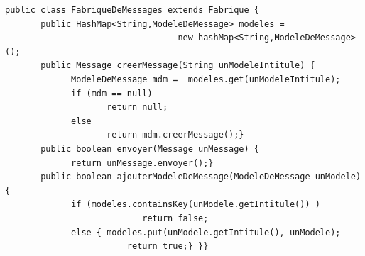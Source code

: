 \documentclass[12pt,French]{article}
\begin{document}
\begin{lstlisting}
public class FabriqueDeMessages extends Fabrique {
       public HashMap<String,ModeleDeMessage> modeles =
                                  new hashMap<String,ModeleDeMessage>();
       public Message creerMessage(String unModeleIntitule) {
             ModeleDeMessage mdm =  modeles.get(unModeleIntitule);
             if (mdm == null)
                    return null;
             else
                    return mdm.creerMessage();}
       public boolean envoyer(Message unMessage) {
             return unMessage.envoyer();}
       public boolean ajouterModeleDeMessage(ModeleDeMessage unModele){
             if (modeles.containsKey(unModele.getIntitule()) )
                           return false;
             else {	modeles.put(unModele.getIntitule(), unModele);
                    	return true;} }}
\end{lstlisting}
\end{document}
